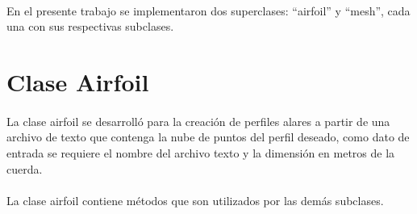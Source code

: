 \documentclass[letterpaper, openright, 12pt]{book}
\begin{document}
    \paragraph*{}
        En el presente trabajo se implementaron dos superclases: ``airfoil'' y
        ``mesh'', cada una con sus respectivas subclases.


    \section{Clase Airfoil}
    \paragraph*{}
        La clase airfoil se desarrolló para la creación de perfiles alares a
        partir de una archivo de texto que contenga la nube de puntos del perfil
        deseado, como dato de entrada se requiere el nombre del archivo texto y
        la dimensión en metros de la cuerda.
    \paragraph*{}
        La clase airfoil contiene métodos que son utilizados por las demás
        subclases.
\end{document}
